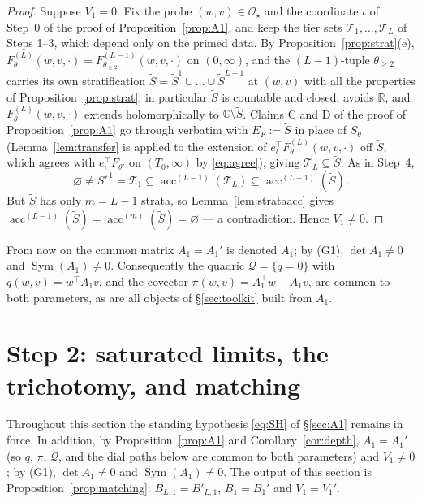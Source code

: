 \documentclass[11pt]{article}
\theoremstyle{definition}
\theoremstyle{remark}
\theoremstyle{plain}
\newcommand{\R}{\mathbb{R}}
\newcommand{\C}{\mathbb{C}}
\newcommand{\cO}{\mathcal{O}}
\newcommand{\cQ}{\mathcal{Q}}
\newcommand{\cT}{\mathcal{T}}
\newcommand{\Sym}{\operatorname{Sym}}
\newcommand{\acc}{\operatorname{acc}}
\begin{document}
\begin{proof}
Suppose $V_1=0$.  Fix the probe $(w,v)\in\cO_\star$ and the coordinate $\iota$ of
Step~0 of the proof of Proposition~\ref{prop:A1}, and keep the tier sets
$\cT_1,\dots,\cT_L$ of Steps 1--3, which depend only on the primed data.  By
Proposition~\ref{prop:strat}(e), $F^{(L)}_\theta(w,v,\cdot)
=F^{(L-1)}_{\theta_{\ge2}}(w,v,\cdot)$ on $(0,\infty)$, and the $(L-1)$-tuple
$\theta_{\ge2}$ carries its own stratification
$\widetilde S=\widetilde S^1\cup\dots\cup\widetilde S^{L-1}$ at $(w,v)$ with all the
properties of Proposition~\ref{prop:strat}; in particular $\widetilde S$ is countable
and closed, avoids $\R$, and $F^{(L)}_\theta(w,v,\cdot)$ extends holomorphically to
$\C\setminus\widetilde S$.  Claims C and D of the proof of
Proposition~\ref{prop:A1} go through verbatim with $E_F:=\widetilde S$ in place of
$S_\theta$ (Lemma~\ref{lem:transfer} is applied to the extension of
$e_\iota^\top F^{(L)}_\theta(w,v,\cdot)$ off $\widetilde S$, which agrees with
$e_\iota^\top F_{\theta'}$ on $(T_0,\infty)$ by \eqref{eq:agree}), giving
$\cT_L\subseteq\widetilde S$.  As in Step~4,
\[
\varnothing\neq S'^{\,1}=\cT_1\subseteq\acc^{(L-1)}(\cT_L)
\subseteq\acc^{(L-1)}(\widetilde S).
\]
But $\widetilde S$ has only $m=L-1$ strata, so Lemma~\ref{lem:strataacc} gives
$\acc^{(L-1)}(\widetilde S)=\acc^{(m)}(\widetilde S)=\varnothing$ --- a contradiction.
Hence $V_1\neq0$.
\end{proof}

From now on the common matrix $A_1=A_1'$ is denoted $A_1$; by (G1),
$\det A_1\neq0$ and $\Sym(A_1)\neq0$.  Consequently the quadric
$\cQ=\{q=0\}$ with $q(w,v)=w^\top A_1v$, and the covector
$\pi(w,v)=A_1^\top w-A_1v$, are common to both parameters, as are all objects of
\S\ref{sec:toolkit} built from $A_1$.

\section{Step 2: saturated limits, the trichotomy, and matching}\label{sec:cascade}

Throughout this section the standing hypothesis \eqref{eq:SH} of \S\ref{sec:A1} remains
in force.  In addition, by Proposition~\ref{prop:A1} and Corollary~\ref{cor:depth},
$A_1=A_1'$ (so $q$, $\pi$, $\cQ$, and the dial paths below are common to both
parameters) and $V_1\neq0$; by (G1), $\det A_1\neq0$ and $\Sym(A_1)\neq0$.  The output
of this section is Proposition~\ref{prop:matching}:
$B_{L:1}=B'_{L:1}$, $B_1=B_1'$ and $V_1=V_1'$.
\end{document}
